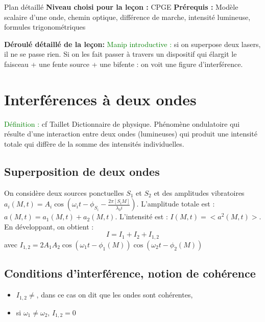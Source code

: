 \begin{reportBlock}{Plan détaillé}
  \textbf{Niveau choisi pour la leçon :} CPGE
  \newline
  \textbf{Prérequis : }Modèle scalaire d'une onde, chemin optique, différence de marche, intensité lumineuse, formules trigonométriques
  \newline
  
  \textbf{Déroulé détaillé de la leçon: } \newline
\textcolor{green}{Manip introductive :} si on superpose deux lasers, il ne se passe rien. Si on les fait passer à travers un dispositif qui élargit le faisceau + une fente source + une bifente : on voit une figure d'interférence.
  \section{Interférences à deux ondes}
  \textcolor{green}{Définition :} cf Taillet Dictionnaire de physique. Phénomène ondulatoire qui résulte d'une interaction entre deux ondes (lumineuses) qui produit une intensité totale qui diffère de la somme des intensités individuelles.
  \subsection{Superposition de deux ondes}
  On considère deux sources ponctuelles $S_1$ et $S_2$ et des amplitudes vibratoires $a_i(M,t)=A_i\cos\left(\omega_it-\phi_{S_i} - \frac{2\pi[S_iM]}{\lambda_0i}\right)$. L'amplitude totale est : $a(M,t)=a_1(M,t)+a_2(M,t)$. L'intensité est : $I(M,t) = <a^2(M,t)>$.\\

  En développant, on obtient :
  \begin{equation}
      I = I_1 + I_2 + I_{1,2}
  \end{equation}
  avec $I_{1,2} = 2A_1A_2\cos\left(\omega_1t-\phi_1(M)\right)\cos\left(\omega_2t-\phi_2(M)\right)$

  \subsection{Conditions d'interférence, notion de cohérence}
  \begin{itemize}
      \item $I_{1,2}\neq$, dans ce cas on dit que les ondes sont cohérentes,
      \item si $\omega_1\neq\omega_2$, $I_{1,2}=0$
  \end{itemize}


\end{reportBlock}
